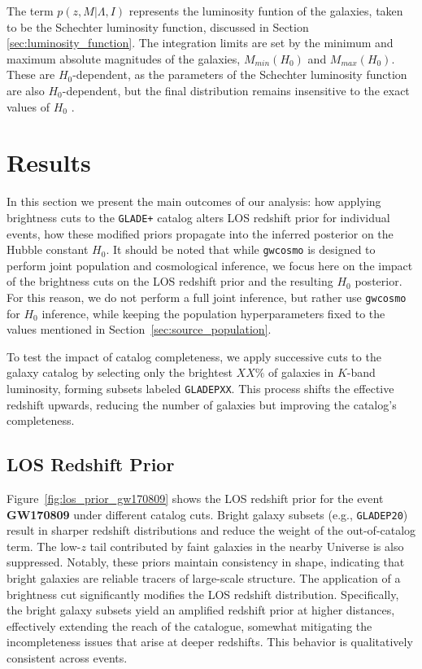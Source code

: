 The term $p(z,M|\Lambda, I)$ represents the luminosity funtion of the galaxies, taken to be the Schechter luminosity function, discussed in Section \ref{sec:luminosity_function}. The integration limits are set by the minimum and maximum absolute magnitudes of the galaxies, $M_{min}(H_0)$ and $M_{max}(H_0)$. These are $H_0$-dependent, as the parameters of the Schechter luminosity function are also $H_0$-dependent, but the final distribution remains insensitive to the exact values of $H_0$ \citep{gray2023joint}.

\section{Results}
In this section we present the main outcomes of our analysis: how applying brightness cuts to the \texttt{GLADE+} catalog alters \ac{LOS} redshift prior for individual events, how these modified priors propagate into the inferred posterior on the Hubble constant $H_0$. It should be noted that while \texttt{gwcosmo} is designed to perform joint population and cosmological inference, we focus here on the impact of the brightness cuts on the \ac{LOS} redshift prior and the resulting $H_0$ posterior. For this reason, we do not perform a full joint inference, but rather use \texttt{gwcosmo} for $H_0$ inference, while keeping the population hyperparameters fixed to the values mentioned in Section~\ref{sec:source_population}.

To test the impact of catalog completeness, we apply successive cuts to the galaxy catalog by selecting only the brightest $XX\%$ of galaxies in $K$-band luminosity, forming subsets labeled \texttt{GLADEPXX}. This process shifts the effective redshift upwards, reducing the number of galaxies but improving the catalog's completeness.

\subsection{\ac{LOS} Redshift Prior}
Figure~\ref{fig:los_prior_gw170809} shows the LOS redshift prior for the event \textbf{GW170809} under different catalog cuts. Bright galaxy subsets (e.g., \texttt{GLADEP20}) result in sharper redshift distributions and reduce the weight of the out-of-catalog term. The low-$z$ tail contributed by faint galaxies in the nearby Universe is also suppressed. Notably, these priors maintain consistency in shape, indicating that bright galaxies are reliable tracers of large-scale structure. The application of a brightness cut significantly modifies the \ac{LOS} redshift distribution. Specifically, the bright galaxy subsets yield an amplified redshift prior at higher distances, effectively extending the reach of the catalogue, somewhat mitigating the incompleteness issues that arise at deeper redshifts. This behavior is qualitatively consistent across events.

